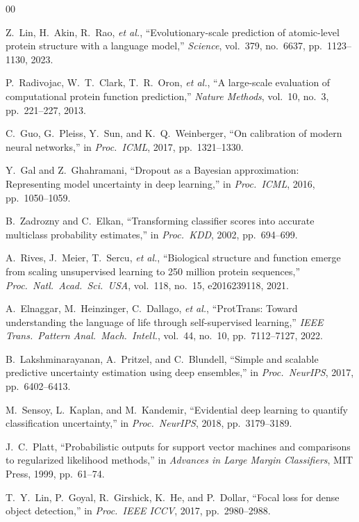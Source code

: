 \documentclass[conference]{IEEEtran}
\begin{document}
\begin{thebibliography}{00}

 Z.~Lin, H.~Akin, R.~Rao, \textit{et al.}, ``Evolutionary-scale prediction of atomic-level protein structure with a language model,'' \textit{Science}, vol.~379, no.~6637, pp.~1123--1130, 2023.

 P.~Radivojac, W.~T.~Clark, T.~R.~Oron, \textit{et al.}, ``A large-scale evaluation of computational protein function prediction,'' \textit{Nature Methods}, vol.~10, no.~3, pp.~221--227, 2013.

 C.~Guo, G.~Pleiss, Y.~Sun, and K.~Q.~Weinberger, ``On calibration of modern neural networks,'' in \textit{Proc.\ ICML}, 2017, pp.~1321--1330.

 Y.~Gal and Z.~Ghahramani, ``Dropout as a Bayesian approximation: Representing model uncertainty in deep learning,'' in \textit{Proc.\ ICML}, 2016, pp.~1050--1059.

 B.~Zadrozny and C.~Elkan, ``Transforming classifier scores into accurate multiclass probability estimates,'' in \textit{Proc.\ KDD}, 2002, pp.~694--699.

 A.~Rives, J.~Meier, T.~Sercu, \textit{et al.}, ``Biological structure and function emerge from scaling unsupervised learning to 250 million protein sequences,'' \textit{Proc.\ Natl.\ Acad.\ Sci.\ USA}, vol.~118, no.~15, e2016239118, 2021.

 A.~Elnaggar, M.~Heinzinger, C.~Dallago, \textit{et al.}, ``ProtTrans: Toward understanding the language of life through self-supervised learning,'' \textit{IEEE Trans.\ Pattern Anal.\ Mach.\ Intell.}, vol.~44, no.~10, pp.~7112--7127, 2022.

 B.~Lakshminarayanan, A.~Pritzel, and C.~Blundell, ``Simple and scalable predictive uncertainty estimation using deep ensembles,'' in \textit{Proc.\ NeurIPS}, 2017, pp.~6402--6413.

 M.~Sensoy, L.~Kaplan, and M.~Kandemir, ``Evidential deep learning to quantify classification uncertainty,'' in \textit{Proc.\ NeurIPS}, 2018, pp.~3179--3189.

 J.~C.~Platt, ``Probabilistic outputs for support vector machines and comparisons to regularized likelihood methods,'' in \textit{Advances in Large Margin Classifiers}, MIT Press, 1999, pp.~61--74.

 T.~Y.~Lin, P.~Goyal, R.~Girshick, K.~He, and P.~Dollar, ``Focal loss for dense object detection,'' in \textit{Proc.\ IEEE ICCV}, 2017, pp.~2980--2988.


\end{thebibliography}
\end{document}
